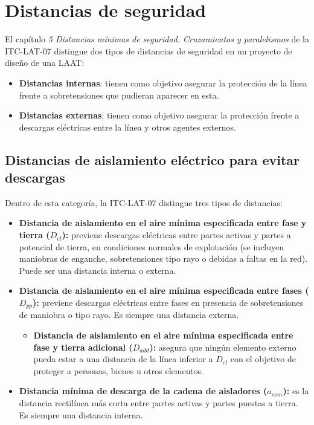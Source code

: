 \section{Distancias de seguridad}
\label{sec:mc-distancias}
El capítulo \textit{5 Distancias mínimas de seguridad. Cruzamientos y paralelismos} de la ITC-LAT-07 distingue dos tipos de distancias de seguridad en un proyecto de diseño de una \ac{LAAT}:

\begin{itemize}
    \item \textbf{Distancias internas}: tienen como objetivo asegurar la protección de la línea frente a sobretensiones que pudieran aparecer en esta.
    \item \textbf{Distancias externas}: tienen como objetivo asegurar la protección frente a descargas eléctricas entre la línea y otros agentes externos.
\end{itemize}

\subsection{Distancias de aislamiento eléctrico para evitar descargas}
\label{subsec:dist-aislElectrico}
Dentro de esta categoría, la ITC-LAT-07 distingue tres tipos de distancias:

\begin{itemize}
    \item \textbf{Distancia de aislamiento en el aire mínima especificada entre fase y tierra ($D_{el}$):} previene descargas eléctricas entre partes activas y partes a potencial de tierra, en condiciones normales de explotación (se incluyen maniobras de enganche, sobretensiones tipo rayo o debidas a faltas en la red). Puede ser una distancia interna o externa.
    \item \textbf{Distancia de aislamiento en el aire mínima especificada entre fases ($D_{pp}$):} previene descargas eléctricas entre fases en presencia de sobretensiones de maniobra o tipo rayo. Es siempre una distancia externa.
    \begin{itemize}
        \item \textbf{Distancia de aislamiento en el aire mínima especificada entre fase y tierra adicional ($D_{add}$):} asegura que ningún elemento externo pueda estar a una distancia de la línea inferior a $D_{el}$ con el objetivo de proteger a personas, bienes u otros elementos.
    \end{itemize}  
    \item \textbf{Distancia mínima de descarga de la cadena de aisladores ($a_{som}$):} es la distancia rectilínea más corta entre partes activas y partes puestas a tierra. Es siempre una distancia interna.
\end{itemize}

